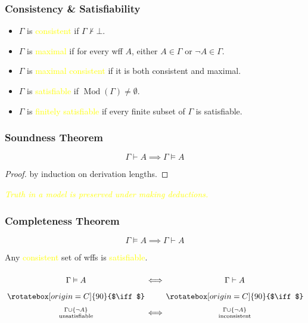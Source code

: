\documentclass[UTF8,11pt,colorlinks,compress,openany]{beamer}%
\begin{document}
\begin{frame}\frametitle{Consistency \& Satisfiability}
	\begin{itemize}
		\item $\Gamma$ is \textcolor{yellow}{consistent} if $\Gamma\nvdash\bot$.
		\item $\Gamma$ is \textcolor{yellow}{maximal} if for every wff $A$, either $A\in\Gamma$ or $\neg A\in\Gamma$.
		\item $\Gamma$ is \textcolor{yellow}{maximal consistent} if it is both consistent and maximal.
	\end{itemize}
	\begin{itemize}
		\item $\Gamma$ is \textcolor{yellow}{satisfiable} if $\operatorname{Mod}(\Gamma)\neq\emptyset$.
		\item $\Gamma$ is \textcolor{yellow}{finitely satisfiable} if every finite subset of $\Gamma$ is satisfiable.
	\end{itemize}
\end{frame}

\begin{frame}\frametitle{Soundness Theorem}
	\begin{theorem}
		\[\Gamma\vdash A\implies\Gamma\vDash A\]
	\end{theorem}
	\begin{proof}
		by induction on derivation lengths.
	\end{proof}
	\centering \emph{\textcolor{yellow}{Truth in a model is preserved under making deductions.}}
\end{frame}

\begin{frame}\frametitle{Completeness Theorem}
		\begin{theorem}
			\[\Gamma\vDash A\implies\Gamma\vdash A\]
		\end{theorem}
		\begin{corollary}
			Any \textcolor{yellow}{consistent} set of wffs is \textcolor{yellow}{satisfiable}.
		\end{corollary}\vspace*{-3ex}
		{\Large \[\arraycolsep=0.7pt\def\arraystretch{1.7}
			\begin{array}{cccc}
			&\Gamma\vDash A&\iff&\Gamma\vdash A\\
			&\rotatebox[origin=C]{90}{$\iff$}&&\rotatebox[origin=C]{90}{$\iff$}\\
			&\Gamma\cup\{\neg A\}\atop{\text{unsatisfiable}}&\iff&\Gamma\cup\{\neg A\}\atop{\text{inconsistent}}
			\end{array}
			\]}
\end{frame}
\end{document}
